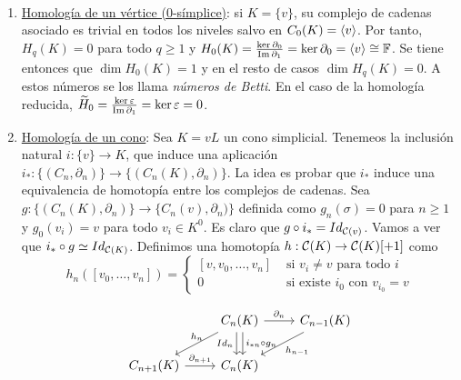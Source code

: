\documentclass[HS.tex]{subfiles}
\begin{document}
\begin{ej}\
\begin{enumerate}
\item \underline{Homología de un vértice (0-símplice)}: si $K=\{v\}$, su complejo de cadenas asociado es trivial en todos los niveles salvo en $C_0(K)=\langle{v}\rangle$. Por tanto, $H_q(K)=0$ para todo $q\geq 1$ y $H_0(K)=\frac{\ker\partial_0}{\operatorname{Im}\partial_1}=\ker\partial_0=\langle{v}\rangle\cong\mathbb{F}$. Se tiene entonces que $\dim H_0(K)=1$ y en el resto de casos $\dim H_q(K)=0$. A estos números se los llama \emph{números de Betti}. En el caso de la homología reducida, $\widetilde{H}_0=\frac{\ker\varepsilon}{\operatorname{Im}\partial_1}=\ker\varepsilon=0$. 

\item \underline{Homología de un cono}: Sea $K=vL$ un cono simplicial. Tenemeos la inclusión natural $i:\{v\}\to K$, que induce una aplicación $i_*: \{(C_n,\partial_n)\}\to \{(C_n(K),\partial_n)\}$. La idea es probar que $i_*$ induce una equivalencia de homotopía entre los complejos de cadenas. Sea $g:\{(C_n(K),\partial_n)\}\to \{C_n(v),\partial_n)\}$ definida como $g_n(\sigma)=0$ para $n\geq 1$ y $g_0(v_i)=v$ para todo $v_i\in K^0$. Es claro que $g\circ i_*=Id_{\mathcal{C}(v)}$. Vamos a ver que $i_*\circ g\simeq Id_{\mathcal{C}(K)}$. Definimos una homotopía $h: \mathcal{C}(K)\to\mathcal{C}(K)[+1]$ como 
\[
h_n ([v_0,\dots,v_n]) = \begin{cases}
	[v, v_0,\dots,v_n] & \text{ si }v_i \neq v\text{ para todo }i\\
	0 & \text{ si existe }i_0\text{ con }v_{i_0} = v
\end{cases}
\]

\[
\begin{tikzcd}
& C_n(K)\arrow[r, "\partial_n"]\arrow[ld, "h_n" above]\arrow[d, shift left, "Id_n" left=5pt]\arrow[d, shift right, "i_{*n} \circ g_n" right=5pt] & C_{n-1}(K)\arrow[ld, "h_{n-1}"]\\
C_{n+1}(K)\arrow[r, "\partial_{n+1}"] & C_n(K)
\end{tikzcd}
\]


\end{enumerate}
\end{ej}
\end{document}
